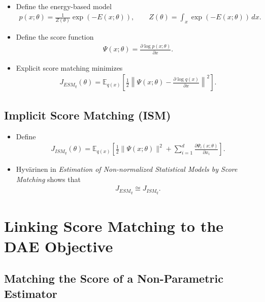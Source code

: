 \documentclass[10pt]{article}
\newcommand{\EE}{\mathbb{E}}
\newcommand{\ESM}{J_{ESM_q}}
\newcommand{\ISM}{J_{ISM_q}}
\begin{document}
\begin{itemize}
\item Define the energy-based model
\begin{align*}
p(x;\theta) = \frac{1}{Z(\theta)} \exp(-E(x;\theta)), \qquad Z(\theta) = \int_x \exp(-E(x;\theta)) \, dx.
\end{align*}
\item Define the score function
\begin{align*}
\Psi(x;\theta) = \frac{\partial \log p(x;\theta)}{\partial x}.
\end{align*}
\item Explicit score matching minimizes
\begin{align*}
\ESM(\theta) = \EE_{q(x)} \left[ \frac{1}{2} \left\| \Psi(x;\theta) - \frac{\partial \log q(x)}{\partial x} \right\|^2 \right].
\end{align*}
\end{itemize}

\subsection{Implicit Score Matching (ISM)}

\begin{itemize}
\item Define
\begin{align*}
\ISM(\theta) = \EE_{q(x)} \left[ \frac{1}{2} \|\Psi(x;\theta)\|^2 + \sum_{i = 1}^d \frac{\partial \Psi_i(x;\theta)}{\partial x_i} \right].
\end{align*}
\item Hyv\"{a}rinen in \textit{Estimation of Non-normalized Statistical Models by Score Matching} shows that
\begin{align*}
\ESM \cong \ISM.
\end{align*}
\end{itemize}

\newpage

\section{Linking Score Matching to the DAE Objective}

\subsection{Matching the Score of a Non-Parametric Estimator}
\end{document}

